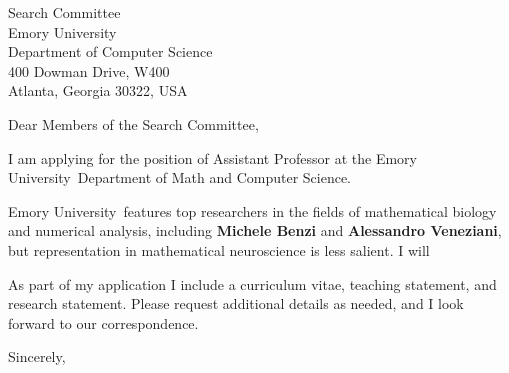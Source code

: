 \documentclass[11pt,a4paper]{letter}
\begin{document}

\def\School{Emory University}

\begin{letter}
{Search Committee\\
Emory University\\
Department of Computer Science\\
400 Dowman Drive, W400\\
Atlanta, Georgia 30322, USA}


\opening{Dear Members of the Search Committee,}

I am applying for the position of Assistant Professor at the \School~Department of Math and Computer Science. 



\School~features top researchers in the fields of mathematical biology and numerical analysis, including \textbf{Michele Benzi} and \textbf{Alessandro Veneziani}, but representation in mathematical neuroscience is less salient. I will 



As part of my application I include a curriculum vitae, teaching statement, and research statement. Please request additional details as needed, and I look forward to our correspondence.

\closing{Sincerely,}
\end{letter}
\end{document}
